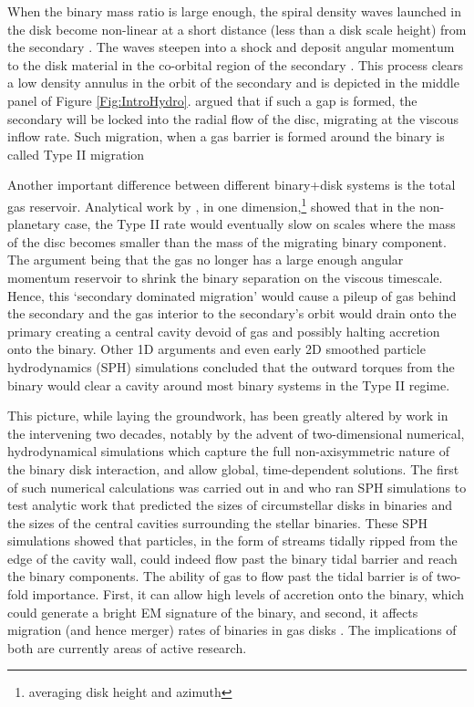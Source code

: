 When the binary mass ratio is large enough, the spiral density waves launched
in the disk become non-linear at a short distance (less than a disk scale
height) from the secondary \citep{GoodmanRafikov:2001}. The waves steepen into
a shock and deposit angular momentum to the disk material in the co-orbital
region of the secondary \citep[see Chapter \ref{ch:CBDTrans} and also][]{DongRafI:2011, DongRafII:2011, LinPapaI:1984,LinPapa86b,
LinPapaIII:1986}. This process clears a low density annulus in the orbit of
the secondary and is depicted in the middle panel of Figure
\ref{Fig:IntroHydro}. \cite{LinPapa86b} argued that if
such a gap is formed, the secondary will be locked into the radial flow of the
disc, migrating at the viscous inflow rate. Such migration, when a gas barrier
is formed around the binary is called Type II migration \citep[see also][and Chapter \ref{ch:CBDTrans}]{Ward:1997, KleyNelson:2012:rev}



Another important difference between different binary+disk systems is the
total gas reservoir. Analytical work by \citep{SyerClarke95, Ivanov99}, in
one dimension,\footnote{averaging disk height and azimuth} showed that in the
non-planetary case, the Type II rate would eventually slow on scales where the
mass of the disc becomes smaller than the mass of the migrating binary
component. The argument being that the gas no longer has a large enough angular
momentum reservoir to shrink the binary separation on the viscous
timescale. Hence, this `secondary dominated migration' would cause a pileup of
gas behind the secondary and the gas interior to the secondary's orbit would
drain onto the primary creating a central cavity devoid of gas and possibly
halting accretion onto the binary. Other 1D arguments
\citep[][]{Milos:Phinney:2005} and even early 2D smoothed particle hydrodynamics
(SPH) simulations \citep{Artymowicz:1991} concluded that the outward torques
from the binary would clear a cavity around most binary systems in the Type II
regime.


This picture, while laying the groundwork, has been greatly altered by work in
the intervening two decades, notably by the advent of two-dimensional
numerical, hydrodynamical simulations which capture the full non-axisymmetric
nature of the binary disk interaction, and allow global, time-dependent
solutions. The first of such numerical calculations was carried out in
\cite{AL94} and \cite{ArtyLubow:1996} who ran SPH simulations to
test analytic work that predicted the sizes of circumstellar disks in binaries
and the sizes of the central cavities surrounding the stellar binaries. These
SPH simulations showed that particles, in the form of streams tidally ripped
from the edge of the cavity wall, could indeed flow past the binary tidal
barrier and reach the binary components. The ability of gas to flow past the
tidal barrier is of two-fold importance. First, it can allow high levels of
accretion onto the binary, which could generate a bright EM signature of the
binary, and second, it affects migration (and hence merger) rates of binaries
in gas disks \citep{DuffellFTV:2014}. The implications of both are currently areas
of active research. 




